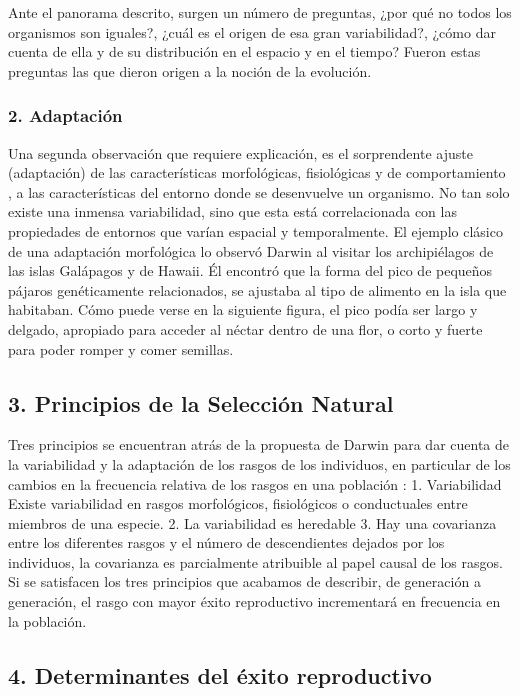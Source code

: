 \documentclass[
  a4paper,
  DIV=11,
  numbers=noendperiod]{scrreprt}
\begin{document}
Ante el panorama descrito, surgen un número de preguntas, ¿por qué no
todos los organismos son iguales?, ¿cuál es el origen de esa gran
variabilidad?, ¿cómo dar cuenta de ella y de su distribución en el
espacio y en el tiempo? Fueron estas preguntas las que dieron origen a
la noción de la evolución.

\subsubsection{2. Adaptación}\label{adaptaciuxf3n}

Una segunda observación que requiere explicación, es el sorprendente
ajuste (adaptación) de las características morfológicas, fisiológicas y
de comportamiento , a las características del entorno donde se
desenvuelve un organismo. No tan solo existe una inmensa variabilidad,
sino que esta está correlacionada con las propiedades de entornos que
varían espacial y temporalmente. El ejemplo clásico de una adaptación
morfológica lo observó Darwin al visitar los archipiélagos de las islas
Galápagos y de Hawaii. Él encontró que la forma del pico de pequeños
pájaros genéticamente relacionados, se ajustaba al tipo de alimento en
la isla que habitaban. Cómo puede verse en la siguiente figura, el pico
podía ser largo y delgado, apropiado para acceder al néctar dentro de
una flor, o corto y fuerte para poder romper y comer semillas.

\subsection{3. Principios de la Selección
Natural}\label{principios-de-la-selecciuxf3n-natural-1}

Tres principios se encuentran atrás de la propuesta de Darwin para dar
cuenta de la variabilidad y la adaptación de los rasgos de los
individuos, en particular de los cambios en la frecuencia relativa de
los rasgos en una población : 1. Variabilidad Existe variabilidad en
rasgos morfológicos, fisiológicos o conductuales entre miembros de una
especie. 2. La variabilidad es heredable 3. Hay una covarianza entre los
diferentes rasgos y el número de descendientes dejados por los
individuos, la covarianza es parcialmente atribuible al papel causal de
los rasgos. Si se satisfacen los tres principios que acabamos de
describir, de generación a generación, el rasgo con mayor éxito
reproductivo incrementará en frecuencia en la población.

\subsection{4. Determinantes del éxito
reproductivo}\label{determinantes-del-uxe9xito-reproductivo}
\end{document}
